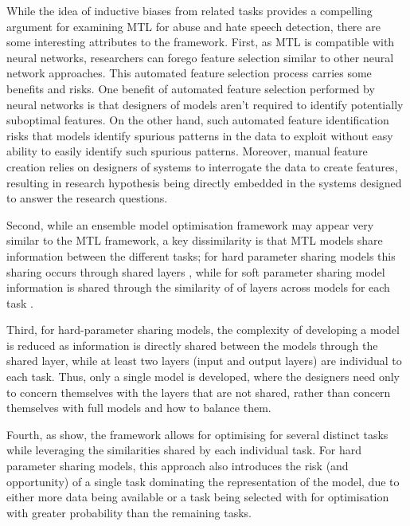 While the idea of inductive biases from related tasks provides a compelling argument for examining MTL for abuse and hate speech detection, there are some interesting attributes to the framework.
First, as MTL is compatible with neural networks, researchers can forego feature selection similar to other neural network approaches. 
This automated feature selection process carries some benefits and risks.
One benefit of automated feature selection performed by neural networks is that designers of models aren't required to identify potentially suboptimal features. 
On the other hand, such automated feature identification risks that models identify spurious patterns in the data to exploit without easy ability to easily identify such spurious patterns.
Moreover, manual feature creation relies on designers of systems to interrogate the data to create features, resulting in research hypothesis being directly embedded in the systems designed to answer the research questions.

Second, while an ensemble model optimisation framework may appear very similar to the MTL framework, a key dissimilarity is that MTL models share information between the different tasks; for hard parameter sharing models this sharing occurs through shared layers \citep{Caruana:1993}, while for soft parameter sharing model information is shared through the similarity of of layers across models for each task \citep{Duong:2015}.

Third, for hard-parameter sharing models, the complexity of developing a model is reduced as information is directly shared between the models through the shared layer, while at least two layers (input and output layers) are individual to each task.
Thus, only a single model is developed, where the designers need only to concern themselves with the layers that are not shared, rather than concern themselves with full models and how to balance them.

Fourth, as \cite{Caruana:1997} show, the framework allows for optimising for several distinct tasks while leveraging the similarities shared by each individual task.
For hard parameter sharing models, this approach also introduces the risk (and opportunity) of a single task dominating the representation of the model, due to either more data being available or a task being selected with for optimisation with greater probability than the remaining tasks.

